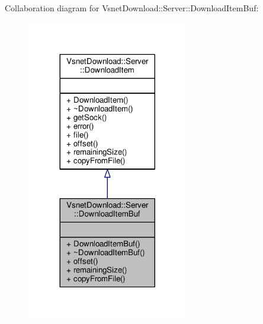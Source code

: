 Collaboration diagram for Vsnet\+Download\+:\+:Server\+:\+:Download\+Item\+Buf\+:
\nopagebreak
\begin{figure}[H]
\begin{center}
\leavevmode
\includegraphics[width=200pt]{d7/d5f/classVsnetDownload_1_1Server_1_1DownloadItemBuf__coll__graph}
\end{center}
\end{figure}
